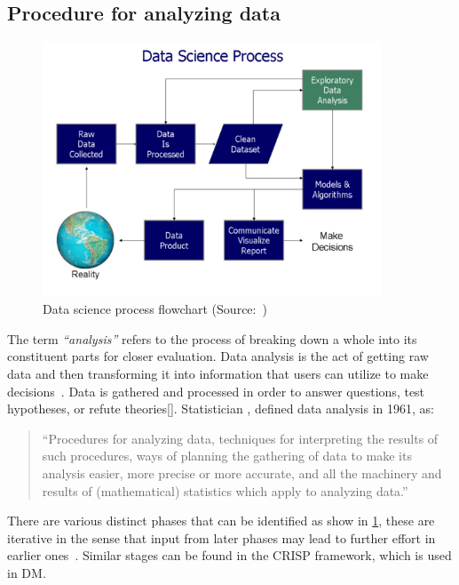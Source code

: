 \subsection{Procedure for analyzing data}
\begin{figure}[t]
    \centering
    \includegraphics[width=0.9\textwidth]{content/chapter_1/images/Data_visualization_process_v1.png}
    \caption{Data science process flowchart (Source:~\cite{Book:doing_data_science})}
    \label{fig:data-science-flowchart}
\end{figure}
The term \textit{``analysis''} refers to the process of breaking down a whole into its constituent parts for closer evaluation.
Data analysis is the act of getting raw data and then transforming it into information that users can utilize to make decisions~\cite{Book:sbrown_2014_transforming}.
Data is gathered and processed in order to answer questions, test hypotheses, or refute theories[].
Statistician \citeauthor{Article:future_of_data_tukey}, defined data analysis in 1961, as:
\begin{quote}
    ``Procedures for analyzing data, techniques for interpreting the results of such procedures, ways of planning the gathering of data to make its analysis easier, 
    more precise or more accurate, and all the machinery and results of (mathematical) statistics which apply to analyzing data.''~\cite{Article:future_of_data_tukey}
\end{quote}
There are various distinct phases that can be identified as show in \ref{fig:data-science-flowchart}, these are iterative in the sense that input from later phases may lead to further effort in earlier ones~\cite{Book:doing_data_science}.
Similar stages can be found in the \ac{CRISP} framework, which is used in \acl{DM}.

